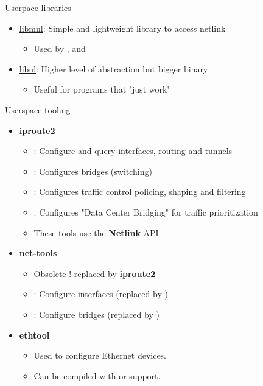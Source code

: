 \begin{frame}{Userpace libraries}
	\begin{itemize}
		\item \href{https://www.netfilter.org/projects/libmnl/index.html}{libmnl}: Simple and lightweight library to access netlink
			\begin{itemize}
				\item Used by ,  and 
			\end{itemize}
		\item \href{https://www.infradead.org/~tgr/libnl/}{libnl}: Higher level of abstraction but bigger binary
			\begin{itemize}
				\item Useful for programs that "just work"
			\end{itemize}
	\end{itemize}
\end{frame}

\begin{frame}{Userspace tooling}
	\begin{itemize}
		\item \textbf{iproute2}
			\begin{itemize}
				\item {} : Configure and query interfaces, routing and tunnels
				\item {} : Configures bridges (switching)
				\item {} : Configures traffic control policing, shaping and filtering
				\item {} : Configures "Data Center Bridging" for traffic prioritization
				\item These tools use the \textbf{Netlink} API
			\end{itemize}
		\item \textbf{net-tools}
			\begin{itemize}
				\item Obsolete ! replaced by \textbf{iproute2}
				\item {} : Configure interfaces (replaced by )
				\item {} : Configure bridges (replaced by )
			\end{itemize}
		\item \textbf{ethtool}
			\begin{itemize}
				\item Used to configure Ethernet devices.
				\item Can be compiled with  or  support.
			\end{itemize}
	\end{itemize}
\end{frame}


